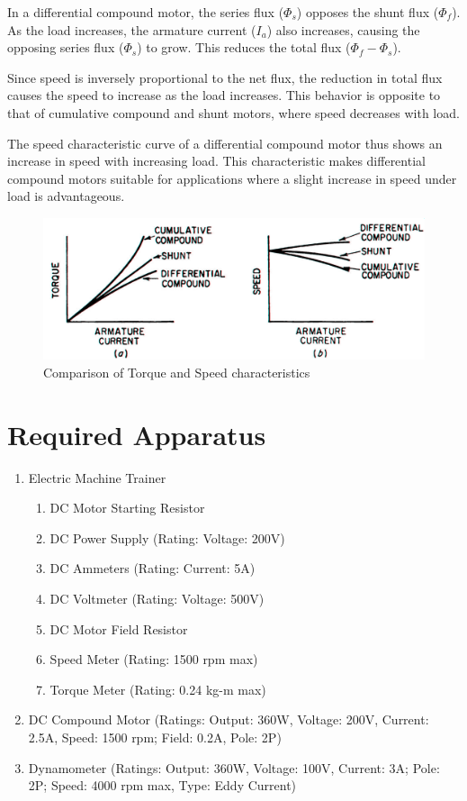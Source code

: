 \documentclass[a4paper,12pt]{article}
\begin{document}
	
	
	In a differential compound motor, the series flux (\(\Phi_s\)) opposes the shunt flux (\(\Phi_f\)). As the load increases, the armature current (\(I_a\)) also increases, causing the opposing series flux (\(\Phi_s\)) to grow. This reduces the total flux (\(\Phi_f - \Phi_s\)).
	
	Since speed is inversely proportional to the net flux, the reduction in total flux causes the speed to increase as the load increases. This behavior is opposite to that of cumulative compound and shunt motors, where speed decreases with load.
	
	The speed characteristic curve of a differential compound motor thus shows an increase in speed with increasing load. This characteristic makes differential compound motors suitable for applications where a slight increase in speed under load is advantageous.
	
	
	\begin{figure}[H]
		\centering
		\includegraphics[width=0.89\linewidth]{Images/screenshot002}
		\caption{Comparison of Torque and Speed characteristics}
		\label{fig:screenshot002}
	\end{figure}
	
	
	
	
	
	
	\section{Required Apparatus}
	\begin{enumerate}
		\item Electric Machine Trainer
		\begin{enumerate}
			\item DC Motor Starting Resistor
		\item DC Power Supply (Rating: Voltage: 200V)
		\item DC Ammeters (Rating: Current: 5A)
		\item DC Voltmeter (Rating: Voltage: 500V)
		  \item DC Motor Field Resistor
		  	\item Speed Meter (Rating: 1500 rpm max)
		  \item Torque Meter (Rating: 0.24 kg-m max)
		\end{enumerate}
	  

	\item DC Compound Motor (Ratings: Output: 360W, Voltage: 200V, Current: 2.5A, Speed: 1500 rpm;  Field: 0.2A, Pole: 2P)
	\item Dynamometer (Ratings: Output: 360W, Voltage: 100V, Current: 3A; Pole: 2P; Speed: 4000 rpm max, Type: Eddy Current)

	\end{enumerate}
	\newpage
\end{document}
